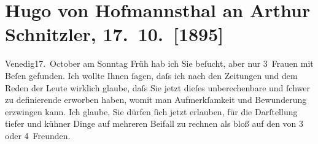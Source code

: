 

         
         \renewcommand{\erwaehntePersonen}{Personen: Richard Beer-Hofmann, Alfred von Berger,  Der Reporter, Karl Kraus}
         \renewcommand{\erwaehnteOrte}{Orte: Venedig, Wien}
         \renewcommand{\erwaehnteWerke}{Werke: Burgtheater [Rechte der Seele, Liebelei], Extrapost. Unparteiische Montags-Zeitung, Jung-Wiener Dichter. (Zur Burgtheater-Première.), Liebelei. Schauspiel in drei Akten}
               \section[Hugo von Hofmannsthal an Arthur Schnitzler, 17. 10. {[}1895{]}]{ Hugo von Hofmannsthal an Arthur Schnitzler, 17. 10. {[}1895{]}}\nopagebreak{}\rehead{ }\begin{ledgroupsized}[t]{13cm}\normalsize\beginnumbering \toendnotes[C]{\smallbreak\pagebreak[2]} 
\toendnotes[C]{\smallbreak}\pstart
           \raggedleft{}{\pb}Venedig17. October\pend
           \pstart
           am Sonntag{ }Früh hab ich Sie beſucht, aber nur 3 Frauen mit Beſen gefunden. Ich
               wollte Ihnen ſagen, daſs ich nach den Zeitungen und dem Reden der Leute wirklich
               glaube, daſs Sie jetzt dieſes unberechenbare und ſchwer zu definierende erworben
               haben, womit man Aufmerkſamkeit und Bewunderung erzwingen kann. Ich glaube, Sie
               dürfen ſich jetzt erlauben, für die Darſtellung {\pb}tiefer und kühner Dinge auf
               mehreren Beifall zu rechnen als bloß auf den von 3 oder 4 Freunden.\pend
           \pstart

\end{ledgroupsized}
